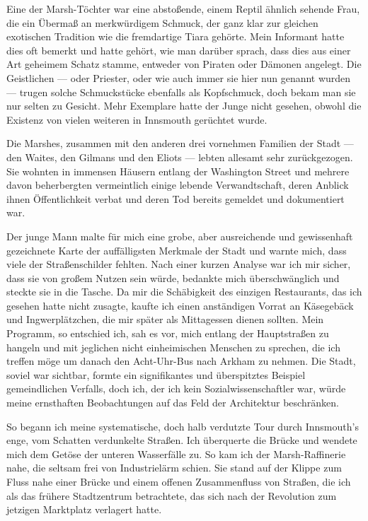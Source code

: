 Eine der Marsh-Töchter war eine  abstoßende, einem Reptil ähnlich sehende Frau, die ein Übermaß an merkwürdigem Schmuck, der ganz klar zur gleichen exotischen Tradition wie die fremdartige Tiara gehörte. Mein Informant hatte dies oft bemerkt und hatte gehört, wie man darüber sprach, dass dies aus einer Art geheimem Schatz stamme, entweder von Piraten oder Dämonen angelegt. Die Geistlichen --- oder Priester, oder wie auch immer sie hier nun genannt wurden --- trugen solche Schmuckstücke ebenfalls als Kopfschmuck, doch bekam man sie nur selten zu Gesicht. Mehr Exemplare hatte der Junge nicht gesehen, obwohl die Existenz von vielen weiteren in Innsmouth gerüchtet wurde.

Die Marshes, zusammen mit den anderen drei vornehmen Familien der Stadt --- den Waites, den Gilmans und den Eliots --- lebten allesamt sehr zurückgezogen. Sie wohnten in immensen Häusern entlang der Washington Street und mehrere davon beherbergten vermeintlich einige lebende Verwandtschaft, deren Anblick ihnen Öffentlichkeit verbat und deren Tod bereits gemeldet und dokumentiert war.

Der junge Mann malte für mich eine grobe, aber ausreichende und gewissenhaft gezeichnete Karte der auffälligsten Merkmale der Stadt und warnte mich, dass viele der Straßenschilder fehlten. Nach einer kurzen Analyse war ich mir sicher, dass sie von großem Nutzen sein würde, bedankte mich überschwänglich und steckte sie in die Tasche. Da mir die Schäbigkeit des einzigen Restaurants, das ich gesehen hatte nicht zusagte, kaufte ich einen anständigen Vorrat an Käsegebäck und Ingwerplätzchen, die mir später als Mittagessen dienen sollten. Mein Programm, so entschied ich, sah es vor, mich entlang der Hauptstraßen zu hangeln und mit jeglichen nicht einheimischen Menschen zu sprechen, die ich treffen möge um danach den Acht-Uhr-Bus nach Arkham zu nehmen. Die Stadt, soviel war sichtbar, formte ein signifikantes und überspitztes Beispiel gemeindlichen Verfalls, doch ich, der ich kein Sozialwissenschaftler war, würde meine ernsthaften Beobachtungen auf das Feld der Architektur beschränken.

So begann ich meine systematische, doch halb verdutzte Tour durch Innsmouth's enge, vom Schatten verdunkelte Straßen. Ich überquerte die Brücke und wendete mich dem Getöse der unteren Wasserfälle zu. So kam ich der Marsh-Raffinerie nahe, die seltsam frei von Industrielärm schien. Sie stand auf der Klippe zum Fluss nahe einer Brücke und einem offenen Zusammenfluss von Straßen, die ich als das frühere Stadtzentrum betrachtete, das  sich nach der Revolution zum jetzigen Marktplatz verlagert hatte.

